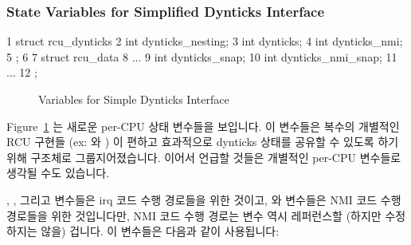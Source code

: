 \subsubsection{State Variables for Simplified Dynticks Interface}
\label{sec:formal:State Variables for Simplified Dynticks Interface}

{ \scriptsize
\begin{verbbox}
  1 struct rcu_dynticks {
  2   int dynticks_nesting;
  3   int dynticks;
  4   int dynticks_nmi;
  5 };
  6
  7 struct rcu_data {
  8   ...
  9   int dynticks_snap;
 10   int dynticks_nmi_snap;
 11   ...
 12 };
\end{verbbox}
}
\begin{figure}[tbp]
\centering
\theverbbox
\caption{Variables for Simple Dynticks Interface}
\label{fig:formal:Variables for Simple Dynticks Interface}
\end{figure}

Figure~\ref{fig:formal:Variables for Simple Dynticks Interface}
는 새로운 per-CPU 상태 변수들을 보입니다.
이 변수들은 복수의 개별적인 RCU 구현들 (ex:  와 ) 이 편하고
효과적으로 dynticks 상태를 공유할 수 있도록 하기 위해 구조체로
그룹지어졌습니다.
이어서 언급할 것들은 개별적인 per-CPU 변수들로 생각될 수도 있습니다.

, , 그리고  변수들은 irq
코드 수행 경로들을 위한 것이고,  와 
변수들은 NMI 코드 수행 경로들을 위한 것입니다만, NMI 코드 수행 경로는
 변수 역시 레퍼런스할 (하지만 수정하지는 않을) 겁니다.
이 변수들은 다음과 같이 사용됩니다:
\iffalse

Figure~\ref{fig:formal:Variables for Simple Dynticks Interface}
shows the new per-CPU state variables.
These variables are grouped into structs to allow multiple independent
RCU implementations (e.g., \co{rcu} and \co{rcu_bh}) to conveniently
and efficiently share dynticks state.
In what follows, they can be thought of as independent per-CPU variables.

The \co{dynticks_nesting}, \co{dynticks}, and \co{dynticks_snap} variables
are for the irq code paths, and the \co{dynticks_nmi} and
\co{dynticks_nmi_snap} variables are for the NMI code paths, although
the NMI code path will also reference (but not modify) the
\co{dynticks_nesting} variable.
These variables are used as follows:
\fi

